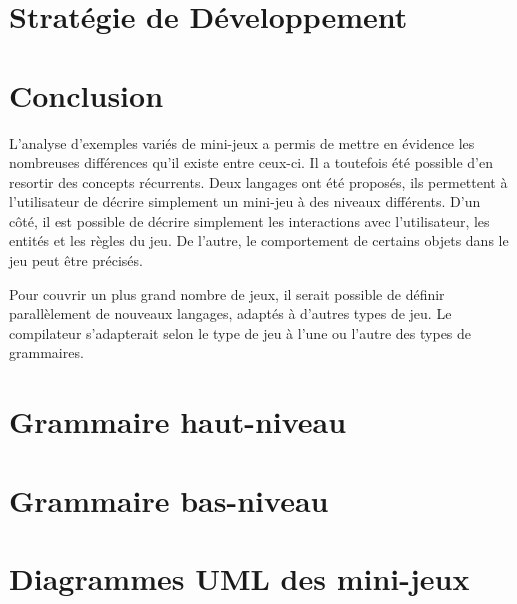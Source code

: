 \documentclass[a4paper,10pt]{article}
\begin{document}
\section{Stratégie de Développement}
\label{sec:strategie}


\section*{Conclusion}
L'analyse d'exemples variés de mini-jeux a permis de mettre en évidence les nombreuses différences qu'il existe entre ceux-ci.
Il a toutefois été possible d'en resortir des concepts récurrents.
Deux langages ont été proposés, ils permettent à l'utilisateur de décrire simplement un mini-jeu à des niveaux différents.
D'un côté, il est possible de décrire simplement les interactions avec l'utilisateur, les entités et les règles du jeu.
De l'autre, le comportement de certains objets dans le jeu peut être précisés.

Pour couvrir un plus grand nombre de jeux, il serait possible de définir parallèlement de nouveaux langages, adaptés à d'autres types de jeu.
Le compilateur s'adapterait selon le type de jeu à l'une ou l'autre des types de grammaires.


\clearpage
\appendix

\section{Grammaire haut-niveau}
\label{sec:hautniveau}


\section{Grammaire bas-niveau}
\label{sec:basniveau}


\clearpage
\section{Diagrammes UML des mini-jeux}
\label{sec:uml}

\end{document}
